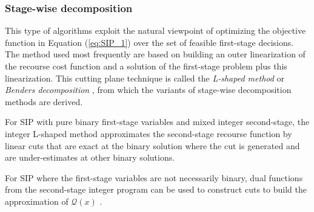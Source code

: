 \subsubsection{Stage-wise decomposition }
This type of algorithms exploit the natural viewpoint of optimizing the objective function in Equation (\ref{eq:SIP_1}) over the set of feasible first-stage decisions. The method used most frequently are based on building an outer linearization of the recourse cost function and a solution of the first-stage problem plus this linearization. This cutting plane technique is called the \textit{L-shaped method} or \textit{Benders decomposition} \cite{B1962}, from which the variants of stage-wise decomposition methods are derived.

For SIP with pure binary first-stage variables and mixed integer second-stage, the integer L-shaped method \cite{LL1993} approximates the second-stage recourse function by linear cuts that are exact at the binary solution where the cut is generated and are under-estimates at other binary solutions. 

For SIP where the first-stage variables are not necessarily binary, dual functions from the second-stage integer program can be used to construct cuts to build the approximation of $\mathcal{Q}(x)$ \cite{CT1998}.  %

